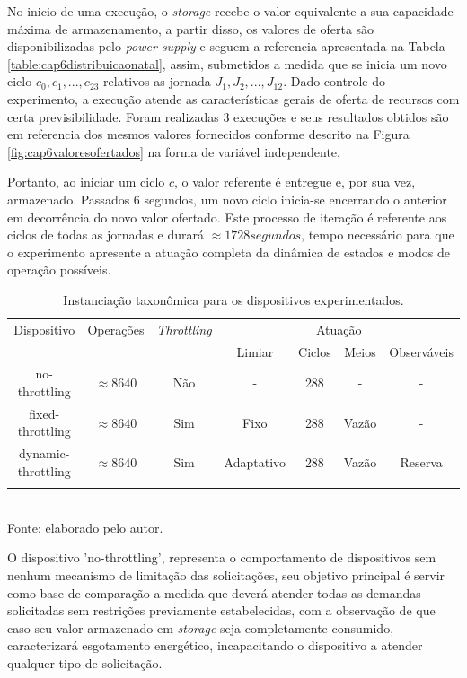 No inicio de uma execução, o \textit{storage} recebe o valor equivalente a sua capacidade máxima de armazenamento, a partir disso, os valores de oferta são disponibilizadas pelo \textit{power supply} e seguem a referencia apresentada na Tabela \ref{table:cap6distribuicaonatal}, assim, submetidos a medida que se inicia um novo ciclo $c_0, c_1,...,c_{23}$ relativos as jornada $J_1, J_2, ..., J_{12}$. Dado controle do experimento, a execução atende as características gerais de oferta de recursos com certa previsibilidade. Foram realizadas 3 execuções e seus resultados obtidos são em referencia dos mesmos valores fornecidos conforme descrito na Figura \ref{fig:cap6valoresofertados} na forma de variável independente.


Portanto, ao iniciar um ciclo $c$, o valor referente é entregue e, por sua vez, armazenado. Passados 6 segundos, um novo ciclo inicia-se encerrando o anterior em decorrência do novo valor ofertado. Este processo de iteração é referente aos ciclos de todas as jornadas e durará $\approx 1728 segundos$, tempo necessário para que o experimento apresente a atuação completa da dinâmica de estados e modos de operação possíveis.

\begingroup
\begin{table}[htbp]
	
	\centering
	\caption{Instanciação taxonômica para os dispositivos experimentados.}
	\small
	\begin{tabular}{ c c c c c c c}
		\toprule
		Dispositivo & Operações & \textit{Throttling} & \multicolumn{4}{c}{Atuação}\\\cline{4-7}		
		& & & Limiar & Ciclos & Meios & Observáveis\\
		\midrule
		 no-throttling  & $\approx 8640$ &Não & - & 288 & - & - \\
		fixed-throttling  & $\approx 8640$ &Sim & Fixo & 288 & Vazão & - \\
		 dynamic-throttling  & $\approx 8640$ &Sim & Adaptativo & 288 & Vazão & Reserva \\
		\bottomrule\addlinespace[2pt]
	\end{tabular}
	\label{table:cap6:dispositivosutilizados}
	\\
	\footnotesize Fonte: elaborado pelo autor.
	
\end{table}
\endgroup

O dispositivo 'no-throttling', representa o comportamento de dispositivos sem nenhum mecanismo de limitação das solicitações, seu objetivo principal é servir como base de comparação a medida que deverá atender todas as demandas solicitadas sem restrições previamente estabelecidas, com a observação de que caso seu valor armazenado em \textit{storage} seja completamente consumido, caracterizará esgotamento energético, incapacitando o dispositivo a atender qualquer tipo de solicitação.

